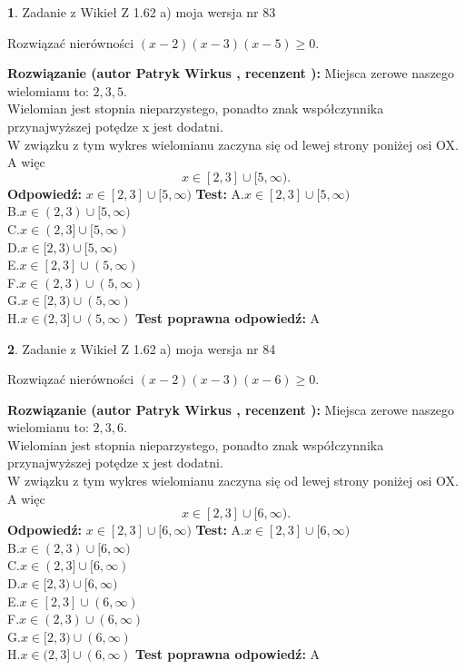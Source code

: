 \documentclass[12pt, a4paper]{article}
\theoremstyle{definition} %
\newtheorem{zad}{}
\newcommand{\zadStart}[1]{\begin{zad}#1\newline}
\newcommand{\zadStop}{\end{zad}}
\newcommand{\rozwStart}[2]{\noindent \textbf{Rozwiązanie (autor #1 , recenzent #2): }\newline}
\newcommand{\rozwStop}{\newline}
\newcommand{\odpStart}{\noindent \textbf{Odpowiedź:}\newline}
\newcommand{\odpStop}{\newline}
\newcommand{\testStart}{\noindent \textbf{Test:}\newline}
\newcommand{\testStop}{\newline}
\newcommand{\kluczStart}{\noindent \textbf{Test poprawna odpowiedź:}\newline}
\newcommand{\kluczStop}{\newline}
\begin{document}
\zadStart{Zadanie z Wikieł Z 1.62 a) moja wersja nr 83}

Rozwiązać nierówności $(x-2)(x-3)(x-5)\ge0$.
\zadStop
\rozwStart{Patryk Wirkus}{}
Miejsca zerowe naszego wielomianu to: $2, 3, 5$.\\
Wielomian jest stopnia nieparzystego, ponadto znak współczynnika przy\linebreak najwyższej potędze x jest dodatni.\\ W związku z tym wykres wielomianu zaczyna się od lewej strony poniżej osi OX. A więc $$x \in [2,3] \cup [5,\infty).$$
\rozwStop
\odpStart
$x \in [2,3] \cup [5,\infty)$
\odpStop
\testStart
A.$x \in [2,3] \cup [5,\infty)$\\
B.$x \in (2,3) \cup [5,\infty)$\\
C.$x \in (2,3] \cup [5,\infty)$\\
D.$x \in [2,3) \cup [5,\infty)$\\
E.$x \in [2,3] \cup (5,\infty)$\\
F.$x \in (2,3) \cup (5,\infty)$\\
G.$x \in [2,3) \cup (5,\infty)$\\
H.$x \in (2,3] \cup (5,\infty)$
\testStop
\kluczStart
A
\kluczStop



\zadStart{Zadanie z Wikieł Z 1.62 a) moja wersja nr 84}

Rozwiązać nierówności $(x-2)(x-3)(x-6)\ge0$.
\zadStop
\rozwStart{Patryk Wirkus}{}
Miejsca zerowe naszego wielomianu to: $2, 3, 6$.\\
Wielomian jest stopnia nieparzystego, ponadto znak współczynnika przy\linebreak najwyższej potędze x jest dodatni.\\ W związku z tym wykres wielomianu zaczyna się od lewej strony poniżej osi OX. A więc $$x \in [2,3] \cup [6,\infty).$$
\rozwStop
\odpStart
$x \in [2,3] \cup [6,\infty)$
\odpStop
\testStart
A.$x \in [2,3] \cup [6,\infty)$\\
B.$x \in (2,3) \cup [6,\infty)$\\
C.$x \in (2,3] \cup [6,\infty)$\\
D.$x \in [2,3) \cup [6,\infty)$\\
E.$x \in [2,3] \cup (6,\infty)$\\
F.$x \in (2,3) \cup (6,\infty)$\\
G.$x \in [2,3) \cup (6,\infty)$\\
H.$x \in (2,3] \cup (6,\infty)$
\testStop
\kluczStart
A
\kluczStop
\end{document}
